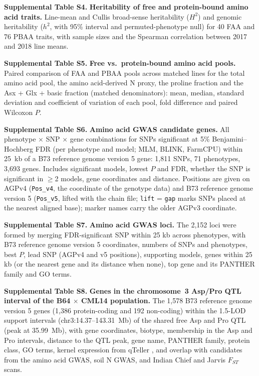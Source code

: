 \documentclass[11pt]{article}
\begin{document}
\noindent\textbf{Supplemental Table S4.} \textbf{Heritability of free and protein-bound amino acid traits.} Line-mean and Cullis broad-sense heritability ($H^2$) and genomic heritability ($h^2$, with 95\% interval and permuted-phenotype null) for 40 FAA and 76 PBAA traits, with sample sizes and the Spearman correlation between 2017 and 2018 line means.

\noindent\textbf{Supplemental Table S5.} \textbf{Free vs.\ protein-bound amino acid pools.} Paired comparison of FAA and PBAA pools across matched lines for the total amino acid pool, the amino acid-derived N proxy, the proline fraction and the Asx + Glx + basic fraction (matched denominators): mean, median, standard deviation and coefficient of variation of each pool, fold difference and paired Wilcoxon $P$.

\noindent\textbf{Supplemental Table S6.} \textbf{Amino acid GWAS candidate genes.} All phenotype $\times$ SNP $\times$ gene combinations for SNPs significant at 5\% Benjamini--Hochberg FDR (per phenotype and model; MLM, BLINK, FarmCPU) within 25~kb of a B73 reference genome version 5 gene: 1,811 SNPs, 71 phenotypes, 3,693 genes. Includes significant models, lowest $P$ and FDR, whether the SNP is significant in $\geq$2 models, gene coordinates and distance. Positions are given on AGPv4 (\texttt{Pos\_v4}, the coordinate of the genotype data) and B73 reference genome version 5 (\texttt{Pos\_v5}, lifted with the chain file; \texttt{lift} = \texttt{gap} marks SNPs placed at the nearest aligned base); marker names carry the older AGPv3 coordinate.

\noindent\textbf{Supplemental Table S7.} \textbf{Amino acid GWAS loci.} The 2,152 loci were formed by merging FDR-significant SNP within 25 kb across phenotypes, with B73 reference genome version 5 coordinates, numbers of SNPs and phenotypes, best $P$, lead SNP (AGPv4 and v5 positions), supporting models, genes within 25 kb (or the nearest gene and its distance when none), top gene and its PANTHER family and GO terms.

\noindent\textbf{Supplemental Table S8.} \textbf{Genes in the chromosome~3 Asp/Pro QTL interval of the B64 $\times$ CML14 population.} The 1,578 B73 reference genome version 5 genes (1,386 protein-coding and 192 non-coding) within the 1.5-LOD support intervals (chr3:14.37--143.31~Mb) of the shared free Asp and Pro QTL (peak at 35.99~Mb), with gene coordinates, biotype, membership in the Asp and Pro intervals, distance to the QTL peak, gene name, PANTHER family, protein class, GO terms, kernel expression from qTeller \citep{qteller}, and overlap with candidates from the amino acid GWAS, soil N GWAS, and Indian Chief and Jarvis $F_{ST}$ scans.
\end{document}
